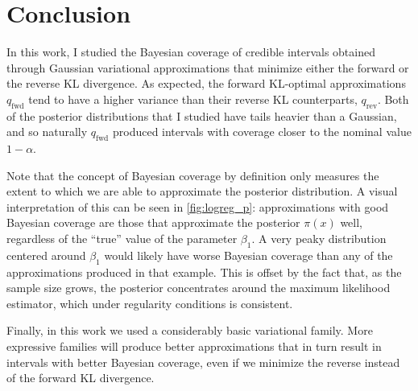 \section{Conclusion} \label{sec:conclusion}

In this work,
I studied the Bayesian coverage of credible intervals
obtained through Gaussian variational approximations that minimize
either the forward or the reverse KL divergence.
As expected,
the forward KL-optimal approximations $q_\mathrm{fwd}$
tend to have a higher variance than their reverse KL counterparts,
$q_\mathrm{rev}$.
Both of the posterior distributions that I studied have tails heavier
than a Gaussian, and so naturally $q_\mathrm{fwd}$ produced intervals
with coverage closer to the nominal value $1-\alpha$.

Note that the concept of Bayesian coverage by definition
only measures the extent to which we are able to approximate
the posterior distribution.
A visual interpretation of this can be seen in \cref{fig:logreg_p}:
approximations with good Bayesian coverage are those that
approximate the posterior $\pi(x)$ well,
regardless of the ``true'' value of the parameter $\beta_1$.
A very peaky distribution centered around $\beta_1$
would likely have worse Bayesian coverage than any of the
approximations produced in that example.
This is offset by the fact that,
as the sample size grows,
the posterior concentrates around the maximum likelihood estimator,
which under regularity conditions is consistent.

Finally, in this work we used a considerably basic variational family.
More expressive families will produce better approximations
that in turn result in intervals with better Bayesian coverage,
even if we minimize the reverse instead of the forward KL divergence.
